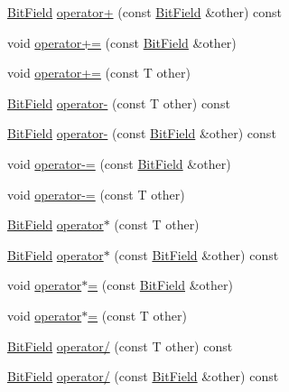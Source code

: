 \begin{DoxyCompactItemize}
\item 
\hyperlink{structmc_1_1_bit_field}{Bit\+Field} \hyperlink{structmc_1_1_bit_field_acf68be20c1b4720db0408e30beecbb50}{operator+} (const \hyperlink{structmc_1_1_bit_field}{Bit\+Field} \&other) const 
\item 
void \hyperlink{structmc_1_1_bit_field_a28fb79281c7d2b5fc747e9253bcd53a5}{operator+=} (const \hyperlink{structmc_1_1_bit_field}{Bit\+Field} \&other)
\item 
void \hyperlink{structmc_1_1_bit_field_a09e45d8ccf6c03a74fed78365447f5d0}{operator+=} (const T other)
\item 
\hyperlink{structmc_1_1_bit_field}{Bit\+Field} \hyperlink{structmc_1_1_bit_field_a4406dde6b327da7fb6d52604a7b0af9f}{operator-\/} (const T other) const 
\item 
\hyperlink{structmc_1_1_bit_field}{Bit\+Field} \hyperlink{structmc_1_1_bit_field_a5d91f80dcee8a72abb0e64530e2e073d}{operator-\/} (const \hyperlink{structmc_1_1_bit_field}{Bit\+Field} \&other) const 
\item 
void \hyperlink{structmc_1_1_bit_field_af86d68ce2858576d85f59d73f81c7878}{operator-\/=} (const \hyperlink{structmc_1_1_bit_field}{Bit\+Field} \&other)
\item 
void \hyperlink{structmc_1_1_bit_field_acb4ec204eda22806184cd29fe680fafa}{operator-\/=} (const T other)
\item 
\hyperlink{structmc_1_1_bit_field}{Bit\+Field} \hyperlink{structmc_1_1_bit_field_a3c2535a2b22b7e0b03e686d4dab2b8a3}{operator$\ast$} (const T other)
\item 
\hyperlink{structmc_1_1_bit_field}{Bit\+Field} \hyperlink{structmc_1_1_bit_field_ab372262696caa9c17635e1f29303582b}{operator$\ast$} (const \hyperlink{structmc_1_1_bit_field}{Bit\+Field} \&other) const 
\item 
void \hyperlink{structmc_1_1_bit_field_a3625c6479695427ddf43f24bee18e416}{operator$\ast$=} (const \hyperlink{structmc_1_1_bit_field}{Bit\+Field} \&other)
\item 
void \hyperlink{structmc_1_1_bit_field_ac7980b8955c0b0ed3274dd390ab00dc0}{operator$\ast$=} (const T other)
\item 
\hyperlink{structmc_1_1_bit_field}{Bit\+Field} \hyperlink{structmc_1_1_bit_field_a7218319586bd58f636eeff7e30723d86}{operator/} (const T other) const 
\item 
\hyperlink{structmc_1_1_bit_field}{Bit\+Field} \hyperlink{structmc_1_1_bit_field_afa50f1186f9a86193a47a51218469fb4}{operator/} (const \hyperlink{structmc_1_1_bit_field}{Bit\+Field} \&other) const 

\end{DoxyCompactItemize}
